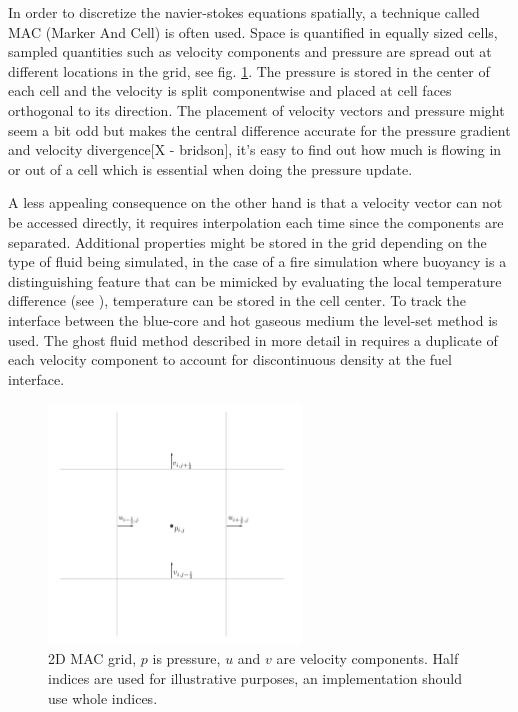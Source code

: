 In order to discretize the navier-stokes equations spatially, a technique called MAC (Marker And Cell) is often used. Space is quantified in equally sized cells, sampled quantities such as velocity components and pressure are spread out at different locations in the grid, see fig. \ref{fig:mac-grid}. The pressure is stored in the center of each cell and the velocity is split componentwise and placed at cell faces orthogonal to its direction. 
The placement of velocity vectors and pressure might seem a bit odd but makes the central difference accurate for the pressure gradient and velocity divergence[X - bridson], it's easy to find out how much is flowing in or out of a cell which is essential when doing the pressure update. 

A less appealing consequence on the other hand is that a velocity vector can not be accessed directly, it requires interpolation each time since the components are separated. Additional properties might be stored in the grid depending on the type of fluid being simulated, in the case of a fire simulation where buoyancy is a distinguishing feature that can be mimicked by evaluating the local temperature difference (see \cite{Nguyen02}), temperature can be stored in the cell center. To track the interface between the blue-core and hot gaseous medium the level-set method is used. The ghost fluid method described in more detail in \cite{Ghost} requires a duplicate of each velocity component to account for discontinuous density at the fuel interface.

\begin{figure}[h!]
\label{fig:mac-grid}
\centering
\includegraphics[width=0.6\textwidth]{mac.png}
\caption{2D MAC grid, $p$ is pressure, $u$ and $v$ are velocity components. Half indices are used for illustrative purposes, an implementation should use whole indices.}
\end{figure}
